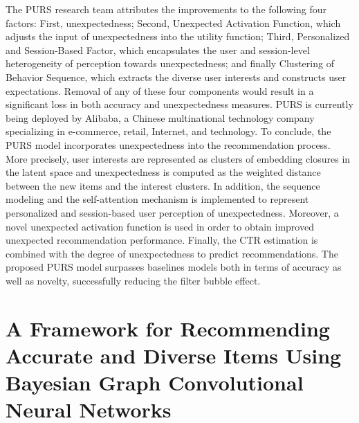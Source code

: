 The PURS research team attributes the improvements to the following four factors: First, unexpectedness; Second, Unexpected Activation Function, which adjusts the input of unexpectedness into the utility function; Third, Personalized and Session-Based Factor, which encapsulates the user and session-level heterogeneity of perception towards unexpectedness; and finally Clustering of Behavior Sequence, which extracts the diverse user interests and constructs user expectations. Removal of any of these four components would result in a significant loss in both accuracy and unexpectedness measures. PURS is currently being deployed by Alibaba, a Chinese multinational technology company specializing in e-commerce, retail, Internet, and technology.
To conclude, the PURS model incorporates unexpectedness into the recommendation process. More precisely, user interests are represented as clusters of embedding closures in the latent space and unexpectedness is computed as the weighted distance between the new items and the interest clusters. In addition, the sequence modeling and the self-attention mechanism is implemented to represent personalized and session-based user perception of unexpectedness. Moreover, a novel unexpected activation function  is used in order to obtain improved unexpected recommendation performance. Finally, the CTR estimation is combined with the degree of unexpectedness to predict recommendations. The proposed PURS model surpasses baselines models both in terms of accuracy as well as novelty, successfully reducing the filter bubble effect. 

\section{A Framework for Recommending Accurate and Diverse Items  Using Bayesian Graph Convolutional Neural Networks}

